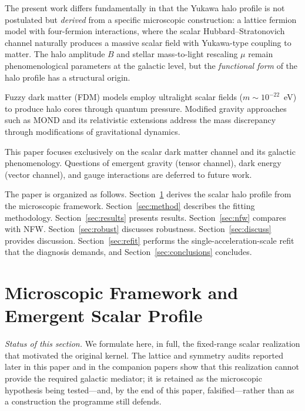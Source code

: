 \documentclass[11pt,a4paper]{article}
\begin{document}
The present work differs fundamentally in that the Yukawa halo
profile is not postulated but \emph{derived} from a specific
microscopic construction: a lattice fermion model with four-fermion
interactions, where the scalar Hubbard--Stratonovich channel
naturally produces a massive scalar field with Yukawa-type coupling
to matter.
The halo amplitude $B$ and stellar mass-to-light rescaling $\mu$
remain phenomenological parameters at the galactic level, but the
\emph{functional form} of the halo profile has a structural origin.

Fuzzy dark matter (FDM) models
\cite{Hu:2000ke,Hui:2016ltb,Schive:2014dra}
employ ultralight scalar fields ($m \sim 10^{-22}$~eV) to produce
halo cores through quantum pressure.
Modified gravity approaches such as MOND
\cite{Milgrom:1983ca,Famaey:2011kh}
and its relativistic extensions \cite{Bekenstein:2004ne}
address the mass discrepancy through modifications of gravitational
dynamics.

This paper focuses exclusively on the scalar dark matter channel
and its galactic phenomenology.
Questions of emergent gravity (tensor channel), dark energy (vector
channel), and gauge interactions are deferred to future work.

The paper is organized as follows.
Section~\ref{sec:micro} derives the scalar halo profile from the
microscopic framework.
Section~\ref{sec:method} describes the fitting methodology.
Section~\ref{sec:results} presents results.
Section~\ref{sec:nfw} compares with NFW.
Section~\ref{sec:robust} discusses robustness.
Section~\ref{sec:discuss} provides discussion.
Section~\ref{sec:refit} performs the single-acceleration-scale
refit that the diagnosis demands, and
Section~\ref{sec:conclusions} concludes.


\section{Microscopic Framework and Emergent Scalar Profile}
\label{sec:micro}

\emph{Status of this section.}  We formulate here, in full, the
fixed-range scalar realization that motivated the original kernel.
The lattice and symmetry audits reported later in this paper and in
the companion papers show that this realization cannot provide the
required galactic mediator; it is retained as the microscopic
hypothesis being tested---and, by the end of this paper,
falsified---rather than as a construction the programme still
defends.
\end{document}
